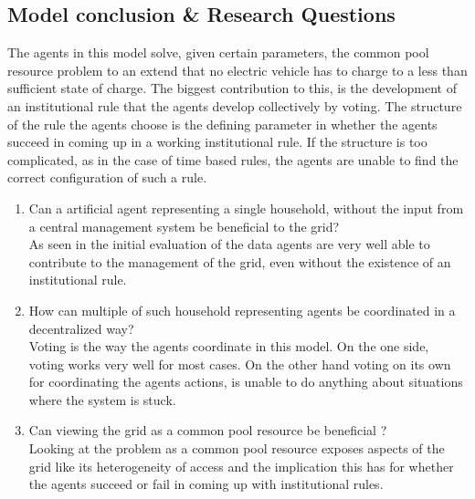 \documentclass[a4paper]{article}
\begin{document}
\subsection{Model conclusion \& Research Questions}

The agents in this model solve, given certain parameters,  the common pool resource problem to an extend that no electric vehicle 
has to charge to a less than sufficient state of charge. The biggest contribution to this, is the development of an institutional rule 
that the agents develop collectively by voting. The structure of the rule the agents choose is the defining parameter in whether the agents
succeed in coming up in a working institutional rule. If the structure is too complicated, as in the case of time based rules, the agents 
are unable to find the correct configuration of such a rule.
\begin{enumerate}
\item Can a artificial agent representing a single household, without the input from a central management system be beneficial to the grid?\\
 As seen in the initial evaluation of the data agents are very well able to contribute to the management of the grid, even without 
 the existence of an institutional rule. 
\item How can multiple of  such household representing agents be coordinated in a decentralized way?\\
Voting is the way the agents coordinate in this model. On the one side, voting works very well for most cases. On the other hand 
voting on its own for coordinating the agents actions, is unable to do anything about situations where the system is stuck. 
\item Can viewing the grid as a common pool resource be beneficial ?\\
Looking at the problem as a common pool resource exposes aspects of the grid like its heterogeneity of access and the implication
this has for whether the agents succeed or fail in coming up with institutional rules. 
\end{enumerate}
\end{document}
